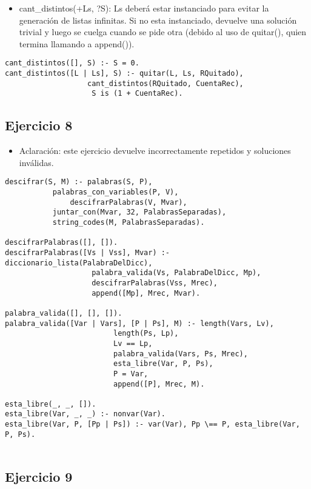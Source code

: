 \documentclass[spanish, 10pt,a4paper]{article}
\numberwithin{equation}{section} %
\begin{document}
\begin{itemize}
\item cant\_distintos(+Ls, ?S): Ls deberá estar instanciado para evitar la generación de listas infinitas. Si no esta instanciado, devuelve una solución trivial y luego se cuelga 
cuando se pide otra (debido al uso de quitar(), quien termina llamando a append()).
\end{itemize}
\begin{lstlisting}
cant_distintos([], S) :- S = 0.
cant_distintos([L | Ls], S) :- quitar(L, Ls, RQuitado), 
			       cant_distintos(RQuitado, CuentaRec), 
			        S is (1 + CuentaRec).
\end{lstlisting}


\subsection{Ejercicio 8}

\begin{itemize}
\item Aclaración: este ejercicio devuelve incorrectamente repetidos y soluciones inválidas.
\end{itemize}
\begin{lstlisting}
descifrar(S, M) :- palabras(S, P), 	
		   palabras_con_variables(P, V), 
    		   descifrarPalabras(V, Mvar), 
		   juntar_con(Mvar, 32, PalabrasSeparadas), 
		   string_codes(M, PalabrasSeparadas).

descifrarPalabras([], []).
descifrarPalabras([Vs | Vss], Mvar) :- diccionario_lista(PalabraDelDicc), 
					palabra_valida(Vs, PalabraDelDicc, Mp), 
					descifrarPalabras(Vss, Mrec), 
					append([Mp], Mrec, Mvar).

palabra_valida([], [], []).
palabra_valida([Var | Vars], [P | Ps], M) :- length(Vars, Lv), 
					     length(Ps, Lp), 
  					     Lv == Lp, 
					     palabra_valida(Vars, Ps, Mrec), 
					     esta_libre(Var, P, Ps),
					     P = Var, 
					     append([P], Mrec, M).

esta_libre(_, _, []).										 
esta_libre(Var, _, _) :- nonvar(Var).											 
esta_libre(Var, P, [Pp | Ps]) :- var(Var), Pp \== P, esta_libre(Var, P, Ps).
											 
\end{lstlisting}


\subsection{Ejercicio 9}
\end{document}
